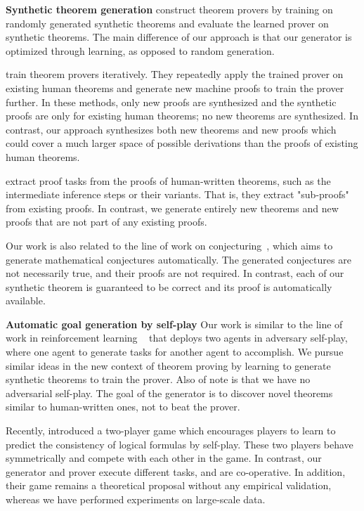 \documentclass{article}
\begin{document}
\noindent\textbf{Synthetic theorem generation} \citet{zombori2019towards, fawzi2019learning} construct theorem provers by training on randomly generated synthetic theorems and evaluate the learned prover on synthetic theorems.
The main difference of our approach is that our generator is optimized through learning, as opposed to random generation. 

\citet{kaliszyk2018reinforcement,jakubuuv2019hammering,urban2008malarea,kaliszyk2014machine,piotrowski2018atpboost} train  theorem provers iteratively. They repeatedly apply the trained prover on existing human theorems and generate new machine proofs to train the prover further. 
In these methods, only new proofs are synthesized and the synthetic proofs are only for existing human theorems; no new theorems are synthesized. In contrast, our approach synthesizes both new theorems and new proofs which could cover a much larger space of possible derivations than the proofs of existing human theorems.

\citet{urban2004mptp,kaliszyk2015learning,kaliszyk2015lemmatization} extract proof tasks from the proofs of human-written theorems, such as the intermediate inference steps or their variants. That is, they extract "sub-proofs" from existing proofs. In contrast, we generate entirely new theorems and new proofs that are not part of any existing proofs.

Our work is also related to the line of work on conjecturing~\citep{chvalovskyfirst,urban2020first,colton2012automated}, which aims to generate mathematical conjectures automatically. The generated conjectures are not necessarily true, and their proofs are not required. In contrast, each of our synthetic theorem is guaranteed to be correct and its proof is automatically available. 

\noindent\textbf{Automatic goal generation by self-play}
Our work is similar to the line of work in reinforcement learning
~\citep{pmlr-v80-florensa18a,sukhbaatar2017intrinsic,sukhbaatar2018learning,durugkar2018adversarial}
that deploys two agents in adversary self-play, where one agent to generate tasks for another agent to accomplish. 
We pursue similar ideas in the new context of theorem proving
by learning to generate synthetic theorems to train the prover. Also of note is that we have no adversarial self-play. The goal of the generator is to discover novel theorems similar to human-written ones, not to beat the prover. 

Recently, \citet{huang@learntoprove} introduced a two-player game which
encourages players to learn to 
predict the consistency of logical formulas by self-play.
These two players behave symmetrically and compete with each other in the game. 
In contrast, our generator and prover execute different tasks, and are co-operative. In addition, their game remains a theoretical proposal without any empirical validation, whereas we have performed experiments on 
large-scale data. 
\end{document}
